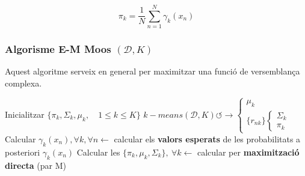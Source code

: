 $$
\boxed{\pi_k = \frac{1}{N} \sum_{n=1}^N \gamma_k(x_n)}
$$

\subsubsection{Algorisme E-M Moos $(\mathcal{D},K)$}

Aquest algoritme serveix en general per maximitzar una funció de versemblança complexa.

\begin{algorithmic}
	\State Inicialitzar $ \{ \pi_k, \Sigma_k, \mu_k, \quad 1 \le k \le K \} $
	\State 
	$
	k-means(\mathcal{D},K) \circlearrowleft \to 
	\begin{cases}
		\mu_k \\
		\{ r_{nk} \} 
		\begin{cases}
			\Sigma_k \\
			\pi_k
		\end{cases}
	\end{cases}
	$
	\Repeat 
		\State Calcular $\gamma_k(x_n), \forall k, \forall n \leftarrow$ calcular els \textbf{valors esperats} de les probabilitats a posteriori $\gamma_k (x_n)$
		\State Calcular les $ \{ \pi_k, \mu_k, \Sigma_k \},\ \forall k \leftarrow $ calcular per \textbf{maximització directa} (par M)
\end{algorithmic}
